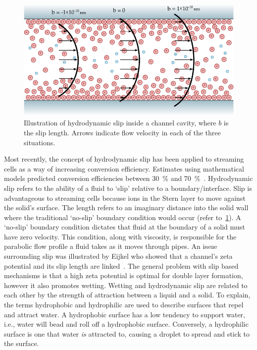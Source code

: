   \begin{figure}
    \centering
    \includegraphics[height=6cm]{content/pt1/graphics/HydrodynamicSlip}
    \caption{\label{fig:HydrodynamicSlip}Illustration of hydrodynamic slip inside a channel cavity, where $b$ is the slip length. Arrows indicate flow velocity in each of the three situations.}
  \end{figure}
  Most recently, the concept of hydrodynamic slip has been applied to streaming cells as a way of increasing conversion efficiency.
  Estimates using mathematical models predicted conversion efficiencies between \SI{30}{\percent} and \SI{70}{\percent}~\cite{Pennathur2007, Davidson2008a, Ren2008}.
  Hydrodynamic slip refers to the ability of a fluid to `slip' relative to a boundary/interface.
  Slip is advantageous to streaming cells because ions in the Stern layer to move against the solid's surface.
  The length refers to an imaginary distance into the solid wall where the traditional `no-slip' boundary condition would occur (refer to~\cref{fig:HydrodynamicSlip}).
  A `no-slip' boundary condition dictates that fluid at the boundary of a solid must have zero velocity.
  This condition, along with viscosity, is responsible for the parabolic flow profile a fluid takes as it moves through pipes.
  An issue surrounding slip was illustrated by Eijkel who showed that a channel's zeta potential and its slip length are linked~\cite{Eijkel2007}.
  The general problem with slip based mechanisms is that a high zeta potential is optimal for double layer formation, however it also promotes wetting.
  Wetting and hydrodynamic slip are related to each other by the strength of attraction between a liquid and a solid.
  To explain, the terms hydrophobic and hydrophilic are used to describe surfaces that repel and attract water. 
  A hydrophobic surface has a low tendency to support water, i.e., water will bead and roll off a hydrophobic surface.
  Conversely, a hydrophilic surface is one that water \emph{is} attracted to, causing a droplet to spread and stick to the surface.
